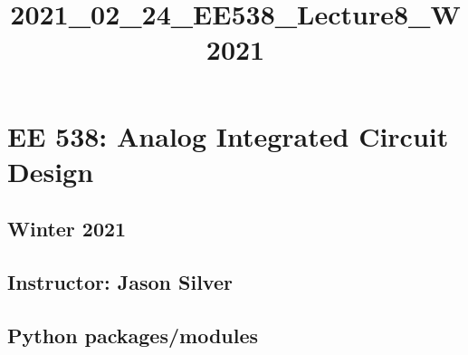 \documentclass[11pt]{article}
\title{2021\_02\_24\_EE538\_Lecture8\_W2021}
\begin{document}
    
    \maketitle
    
    

    
    \hypertarget{ee-538-analog-integrated-circuit-design}{%
\section{EE 538: Analog Integrated Circuit
Design}\label{ee-538-analog-integrated-circuit-design}}

\hypertarget{winter-2021}{%
\subsection{Winter 2021}\label{winter-2021}}

\hypertarget{instructor-jason-silver}{%
\subsection{Instructor: Jason Silver}\label{instructor-jason-silver}}

    \hypertarget{python-packagesmodules}{%
\subsection{Python packages/modules}\label{python-packagesmodules}}
\end{document}
